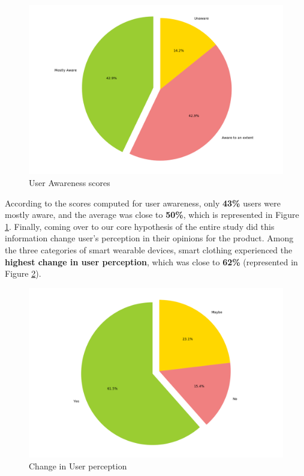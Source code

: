 \documentclass[sigconf]{acmart}
\begin{document}
\begin{figure}[h]
  \centering
  \includegraphics[width=\linewidth]{aware.png}
  \caption{User Awareness scores}
  \label{fig:jacketSeven}
  \Description{}
\end{figure}

According to the scores computed for user awareness, only \textbf{43\%} users were mostly aware, and the average was close to \textbf{50\%}, which is represented in Figure \ref{fig:jacketSeven}. Finally, coming over to our core hypothesis of the entire study did this information change user's perception in their opinions for the product. Among the three categories of smart wearable devices, smart clothing experienced the \textbf{highest change in user perception}, which was close to \textbf{62\%} (represented in Figure \ref{fig:jacketEight}).

\begin{figure}[h]
  \centering
  \includegraphics[width=\linewidth]{perception.png}
  \caption{Change in User perception}
  \label{fig:jacketEight}
  \Description{}
\end{figure}
\end{document}
